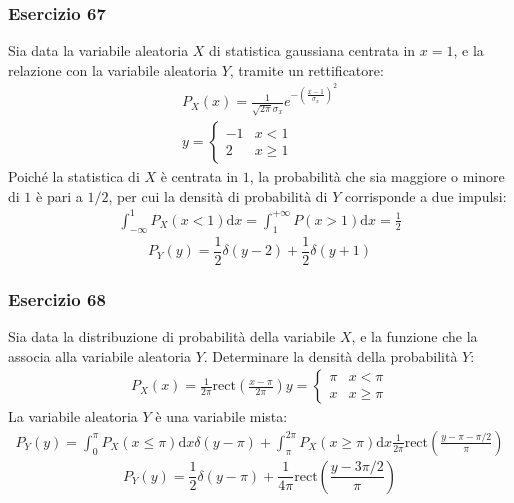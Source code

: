 \documentclass{article}
\newcommand{\rect}{\mathrm{rect}}
\newcommand{\df}{\mathrm{d}}
\begin{document}
\subsubsection*{Esercizio 67}

Sia data la variabile aleatoria $X$ di statistica gaussiana centrata in $x=1$, e la relazione con la variabile aleatoria $Y$, tramite un rettificatore:
\begin{gather*}
    P_X(x)=\displaystyle\frac{1}{\sqrt{2\pi}\sigma_x}e^{-\left(\frac{x-1}{\sigma_x}\right)^2}\\
    y=\begin{cases}
        -1&x< 1\\
        2&x\geq 1
    \end{cases}
\end{gather*}
Poiché la statistica di $X$ è centrata in $1$, la probabilità che sia maggiore o minore di $1$ è pari a $1/2$, per cui la densità di probabilità di 
$Y$ corrisponde a due impulsi:
\begin{gather*}
    \displaystyle\int_{-\infty}^1P_X(x<1)\df x=\int_{1}^{+\infty}P(x>1)\df x=\frac{1}{2}
\end{gather*}
\begin{equation}
    P_Y(y)=\displaystyle\frac{1}{2}\delta(y-2)+\frac{1}{2}\delta(y+1)
\end{equation}

\subsubsection*{Esercizio 68}

Sia data la distribuzione di probabilità della variabile $X$, e la funzione che la associa alla variabile aleatoria $Y$. Determinare la densità della probabilità $Y$:
\begin{gather*}
    P_X(x)=\displaystyle\frac{1}{2\pi}\rect\left(\frac{x-\pi}{2\pi}\right)
    y=\begin{cases}
        \pi &x<\pi\\
        x &x\geq\pi
    \end{cases}
\end{gather*}
La variabile aleatoria $Y$ è una variabile mista:
\begin{gather*}
    P_Y(y)=\displaystyle\int_0^{\pi}P_X(x\leq\pi)\df x\delta(y-\pi)+\int_{\pi}^{2\pi}P_X(x\geq\pi)\df x \frac{1}{2\pi}\rect\left(\frac{y-\pi-\pi/2}{\pi}\right)
\end{gather*}
\begin{equation}
    P_Y(y)=\displaystyle\frac{1}{2}\delta(y-\pi)+\frac{1}{4\pi}\rect\left(\frac{y-3\pi/2}{\pi}\right)
\end{equation}
\end{document}
